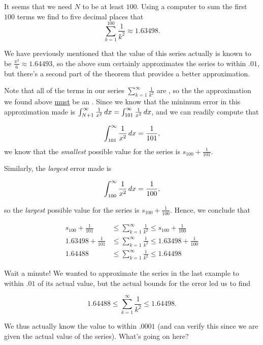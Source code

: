 \documentclass{ximera}
\begin{document}
\begin{model}
It seems that we need $N$ to be at least $100$.  Using a computer to sum the first $100$ terms we find to five decimal places that 
\[
\sum_{k=1}^{100} \frac{1}{k^2} \approx 1.63498.
\]

We have previously mentioned that the value of this series actually is known to be $\frac{\pi^2}{6} \approx 1.64493$, so the above sum certainly approximates the series to within $.01$, but there's a second part of the theorem that provides a better approximation.  

Note that all of the terms in our series $\sum_{k=1}^{\infty} \frac{1}{k^2}$ are , so the the approximation we found above \underline{must} be an .  Since we know that the minimum error in this approximation made is $\int_{N+1}^{\infty} \frac{1}{x^2} \mathop{}\!d x=\int_{101}^{\infty} \frac{1}{x^2} \mathop{}\!d x$, and we can readily compute that 

\[
\int_{101}^{\infty} \frac{1}{x^2} \mathop{}\!d x = \frac{1}{101},
\]
we know that the \emph{smallest} possible value for the series is $s_{100} +  \frac{1}{101}$.  

Similarly, the \emph{largest} error made is 

\[
\int_{100}^{\infty} \frac{1}{x^2} \mathop{}\!d x = \frac{1}{100},
\] 

so the \emph{largest} possible value for the series is $s_{100} +  \frac{1}{100}$.  Hence, we conclude that

\begin{align*}
s_{100} + \frac{1}{101} &\leq \sum_{k=1}^{\infty} \frac{1}{k^2} \leq s_{100} +  \frac{1}{100} \\
1.63498 + \frac{1}{101} & \leq \sum_{k=1}^{\infty} \frac{1}{k^2} \leq 1.63498 + \frac{1}{100} \\
1.64488 &\leq \sum_{k=1}^{\infty} \frac{1}{k^2} \leq 1.64498
\end{align*}

\end{model}

Wait a minute!  We wanted to approximate the series in the last example to within $.01$ of its actual value, but the actual bounds for the error led us to find 

\[
1.64488 \leq \sum_{k=1}^{\infty} \frac{1}{k^2} \leq 1.64498. 
\]

We thus actually know the value to within $.0001$ (and can verify this since we are given the actual value of the series).  What's going on here?  
\end{document}
